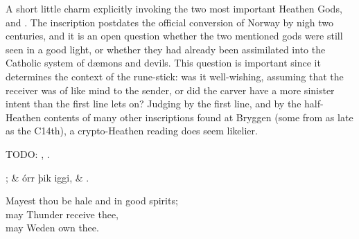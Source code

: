 A short little charm explicitly invoking the two most important Heathen Gods,  and .  The inscription postdates the official conversion of Norway by nigh two centuries, and it is an open question whether the two mentioned gods were still seen in a good light, or whether they had already been assimilated into the Catholic system of dæmons and devils.
This question is important since it determines the context of the rune-stick: was it well-wishing, assuming that the receiver was of like mind to the sender, or did the carver have a more sinister intent than the first line lets on?  Judging by the first line, and by the half-Heathen contents of many other inscriptions found at Bryggen (some from as late as the C14th), a crypto-Heathen reading does seem likelier.

TODO: \textcite{Knirk1995}, \textcite[221--227]{Marold2026}.

\sectionline

\bvg\bva[]; &
\ind {}órr þik iggi, &
\ind {}.\eva

\bvb Mayest thou be hale and in good spirits; \\
may Thunder receive thee, \\
may Weden own thee.\evb\evg

\sectionline
